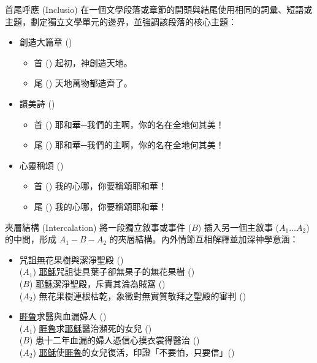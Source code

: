 \documentclass{beamer}
\begin{document}
\begin{frame}{首尾呼應 (Inclusio)}
  在一個文學段落或章節的開頭與結尾使用相同的詞彙、短語或主題，劃定獨立文學單元的邊界，並強調該段落的核心主題\parencite{Inclusio}：
  \begin{itemize}
    \item 創造大篇章 ()
      \begin{itemize}
        \item 首 () 起初，神創造天地。
        \item 尾 () 天地萬物都造齊了。
      \end{itemize}
    \item 讚美詩 ()
      \begin{itemize}
        \item 首 () 耶和華─我們的主啊，你的名在全地何其美！
        \item 尾 () 耶和華─我們的主啊，你的名在全地何其美！
      \end{itemize}
    \item 心靈稱頌 ()
      \begin{itemize}
        \item 首 () 我的心哪，你要稱頌耶和華！
        \item 尾 () 我的心哪，你要稱頌耶和華！
      \end{itemize}
  \end{itemize}
\end{frame}

\begin{frame}{夾層結構 (Intercalation)}
  將一段獨立敘事或事件 ($B$) 插入另一個主敘事 ($A_1 \dots A_2$) 的中間，形成 $A_1 - B - A_2$ 的夾層結構。內外情節互相解釋並加深神學意涵：
  \begin{itemize}
    \item 咒詛無花果樹與潔淨聖殿 ()\parencite{CursedTheFigTree}\\
      \quad($A_1$) \uline{耶穌}咒詛徒具葉子卻無果子的無花果樹 ()\\
      \quad\quad($B$) \uline{耶穌}潔淨聖殿，斥責其淪為賊窩 ()\\
      \quad($A_2$) 無花果樹連根枯乾，象徵對無實質敬拜之聖殿的審判 ()
    \item \uline{睚魯}求醫與血漏婦人 ()\\
      \quad($A_1$) \uline{睚魯}求\uline{耶穌}醫治瀕死的女兒 ()\\
      \quad\quad($B$) 患十二年血漏的婦人憑信心摸衣裳得醫治 ()\\
      \quad($A_2$) \uline{耶穌}使\uline{睚魯}的女兒復活，印證「不要怕，只要信」()
  \end{itemize}
\end{frame}
\end{document}
